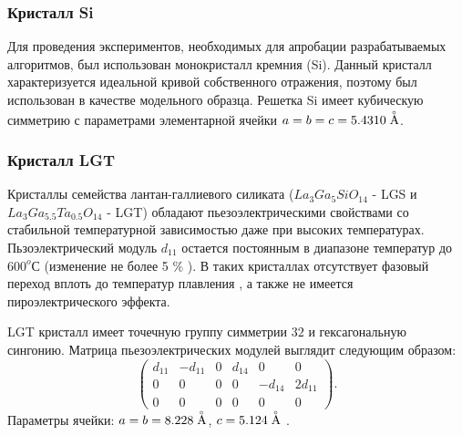   \label{sec:piezo_matrix}

  \subsubsection*{ Кристалл Si }
  Для проведения экспериментов, необходимых для апробации разрабатываемых алгоритмов,
  был использован монокристалл кремния (Si). Данный
  кристалл характеризуется идеальной кривой собственного отражения, поэтому
  был использован в качестве модельного образца. Решетка Si имеет кубическую симметрию
  с параметрами элементарной ячейки  $a = b = c = 5.4310 \angstrom$.

  \subsubsection*{ Кристалл LGT }
  Кристаллы семейства лантан-галлиевого силиката ($La_3Ga_5SiO_{14}$ - LGS и $La_3Ga_{5.5}Ta_{0.5}O_{14}$ - LGT)
  обладают пьезоэлектрическими свойствами со стабильной температурной зависимостью
  даже при высоких температурах. Пьзоэлектрический модуль $d_{11}$ остается
  постоянным в диапазоне температур до $600^o$С (изменение не более 5 $\%$ \cite{LGS58}).
  В таких кристаллах отсутствует фазовый переход вплоть до температур плавления \cite{LGS57},
   а также не имеется пироэлектрического эффекта.

  LGT кристалл имеет точечную группу симметрии $32$ и гексагональную сингонию.
  Матрица пьезоэлектрических модулей выглядит следующим образом:
  \begin{equation}
    \begin{pmatrix}
    d_{11} & -d_{11} & 0 & d_{14} & 0 & 0 \\
    0 & 0 & 0 & 0 & -d_{14} & 2d_{11} \\
    0 & 0 & 0 & 0 & 0 & 0
    \end{pmatrix}.
    \label{eq:piezomodule_lgt_matrica}
  \end{equation}
  Параметры ячейки: $a = b = 8.228 \angstrom$, $c = 5.124 \angstrom$ \cite{marchenkov2014}.
